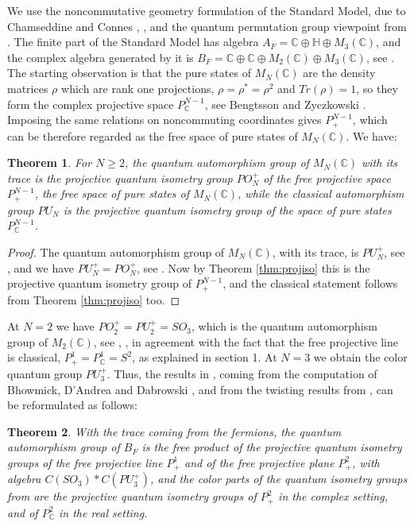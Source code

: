 \documentclass[11pt]{article}
\theoremstyle{plain}
\newtheorem{theorem}{Theorem}[section]
\begin{document}
\bigskip

We use the noncommutative geometry formulation of the Standard Model, due to Chamseddine and Connes \cite{ccs}, \cite{ccm}, and the quantum permutation group viewpoint from \cite{bop}. The finite part of the Standard Model has algebra $A_F=\mathbb C\oplus\mathbb H\oplus M_3(\mathbb C)$, and the complex algebra generated by it is $B_F=\mathbb C\oplus\mathbb C\oplus M_2(\mathbb C)\oplus M_3(\mathbb C)$, see \cite{bop}. The starting observation is that the pure states of $M_N(\mathbb C)$ are the density matrices $\rho$ which are rank one projections, $\rho=\rho^*=\rho^2$ and $Tr(\rho)=1$, so they form the complex projective space $P^{N-1}_\mathbb C$, see Bengtsson and Zyczkowski \cite{bzy}. Imposing the same relations on noncommuting coordinates gives $P^{N-1}_+$, which can be therefore regarded as the free space of pure states of $M_N(\mathbb C)$. We have:

\begin{theorem}
\label{thm:purestates}
For $N\geq2$, the quantum automorphism group of $M_N(\mathbb C)$ with its trace is the projective quantum isometry group $PO_N^+$ of the free projective space $P^{N-1}_+$, the free space of pure states of $M_N(\mathbb C)$, while the classical automorphism group $PU_N$ is the projective quantum isometry group of the space of pure states $P^{N-1}_\mathbb C$.
\end{theorem}

\begin{proof}
The quantum automorphism group of $M_N(\mathbb C)$, with its trace, is $PU_N^+$, see \cite{bop}, and we have $PU_N^+=PO_N^+$, see \cite{bfu}. Now by Theorem \ref{thm:projiso} this is the projective quantum isometry group of $P^{N-1}_+$, and the classical statement follows from Theorem \ref{thm:projiso} too.
\end{proof}

At $N=2$ we have $PO_2^+=PU_2^+=SO_3$, which is the quantum automorphism group of $M_2(\mathbb C)$, see \cite{ba1}, \cite{bop}, in agreement with the fact that the free projective line is classical, $P^1_+=P^1_\mathbb C=S^2$, as explained in section 1. At $N=3$ we obtain the color quantum group $PU_3^+$. Thus, the results in \cite{bop}, coming from the computation of Bhowmick, D'Andrea and Dabrowski \cite{bdd}, and from the twisting results from \cite{bop}, can be reformulated as follows:

\begin{theorem}
\label{thm:smpure}
With the trace coming from the fermions, the quantum automorphism group of $B_F$ is the free product of the projective quantum isometry groups of the free projective line $P^1_+$ and of the free projective plane $P^2_+$, with algebra $C(SO_3)*C(PU_3^+)$, and the color parts of the quantum isometry groups from \cite{bdd} are the projective quantum isometry groups of $P^2_+$ in the complex setting, and of $P^2_\mathbb C$ in the real setting.
\end{theorem}
\end{document}
